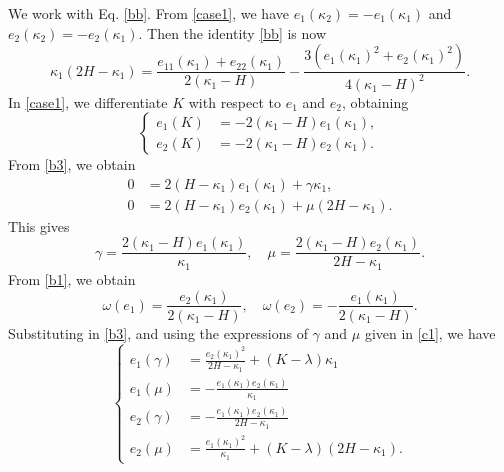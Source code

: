 \documentclass[a4paper,12pt]{amsart}
\theoremstyle{definition}
\begin{document}
We work with Eq.  \eqref{bb}. From \eqref{case1}, we have $e_1(\kappa_2)=-e_1(\kappa_1)$ and $e_2(\kappa_2)=-e_2(\kappa_1)$. Then the identity \eqref{bb} is now
\begin{equation}\label{c11}
\kappa_1(2H-\kappa_1)=\frac{e_{11}(\kappa_1)+e_{22}(\kappa_1)}{2(\kappa_1-H)}-\frac{3(e_1(\kappa_1)^2+e_2(\kappa_1)^2)}{4(\kappa_1-H)^2}.
\end{equation}
In \eqref{case1}, we differentiate $K$  with respect to $e_1$ and $e_2$, obtaining
\begin{equation*}
\left\{
\begin{split}
e_1(K)&=-2( \kappa_1-H)e_1(\kappa_1),\\
e_2(K)&=-2(\kappa_1-H)e_2(\kappa_1).
\end{split}
\right.
\end{equation*}
From \eqref{b3}, we obtain 
\begin{equation*}
\begin{split}
0&=2(H-\kappa_1)e_1(\kappa_1)+\gamma\kappa_1,\\
0&=2(H-\kappa_1)e_2(\kappa_1)+\mu(2H-\kappa_1).
\end{split}
\end{equation*}
This gives 
\begin{equation}\label{c1}
\gamma=\frac{2(\kappa_1-H)e_1(\kappa_1)}{\kappa_1},\quad \mu=\frac{2(\kappa_1-H)e_2(\kappa_1)}{2H-\kappa_1}.
\end{equation}
From \eqref{b1}, we obtain 
\begin{equation}\label{c2}
\omega(e_1)=\frac{e_2(\kappa_1)}{2(\kappa_1-H)},\quad \omega(e_2)=-\frac{e_1(\kappa_1)}{2(\kappa_1-H)}.
\end{equation}
Substituting in  \eqref{b3}, and using the expressions of $\gamma$ and $\mu$ given in \eqref{c1}, we have 
\begin{equation}\label{12}
\left\{
\begin{split}
e_1(\gamma)&=\frac{e_2(\kappa_1)^2}{2H-\kappa_1}+(K-\lambda)\kappa_1\\
e_1(\mu)&=-\frac{e_1(\kappa_1)e_2(\kappa_1)}{\kappa_1}\\
e_2(\gamma)&=-\frac{e_1(\kappa_1)e_2(\kappa_1)}{2H-\kappa_1}\\
e_2(\mu)&=\frac{e_1(\kappa_1)^2}{\kappa_1}+(K-\lambda)(2H-\kappa_1).
\end{split}\right.
\end{equation}
\end{document}
